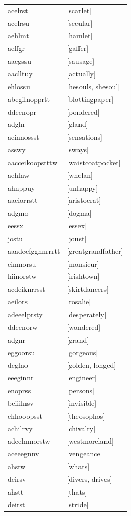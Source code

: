 \documentclass{article}
\begin{document}
\begin{tabular}{ll}
acelrst & [scarlet] \\
acelrsu & [secular] \\
aehlmt & [hamlet] \\
aeffgr & [gaffer] \\
aaegssu & [sausage] \\
aaclltuy & [actually] \\
ehlossu & [hesouls, shesoul] \\
abegilnopprtt & [blottingpaper] \\
ddeenopr & [pondered] \\
adgln & [gland] \\
aeinnossst & [sensations] \\
asswy & [sways] \\
aacceikoopstttw & [waistcoatpocket] \\
aehlnw & [whelan] \\
ahnppuy & [unhappy] \\
aaciorrstt & [aristocrat] \\
adgmo & [dogma] \\
eessx & [essex] \\
jostu & [joust] \\
aaadeefgghnrrrtt & [greatgrandfather] \\
eimnorsu & [monsieur] \\
hiinorstw & [irishtown] \\
acdeiknrrsst & [skirtdancers] \\
aeilors & [rosalie] \\
adeeelprsty & [desperately] \\
ddeenorw & [wondered] \\
adgnr & [grand] \\
eggoorsu & [gorgeous] \\
deglno & [golden, longed] \\
eeeginnr & [engineer] \\
enoprss & [persons] \\
beiiilnsv & [invisible] \\
ehhooopsst & [theosophos] \\
achilrvy & [chivalry] \\
adeelmnorstw & [westmoreland] \\
aceeegnnv & [vengeance] \\
ahstw & [whats] \\
deirsv & [divers, drives] \\
ahstt & [thats] \\
deirst & [stride] \\

\end{tabular}
\end{document}
